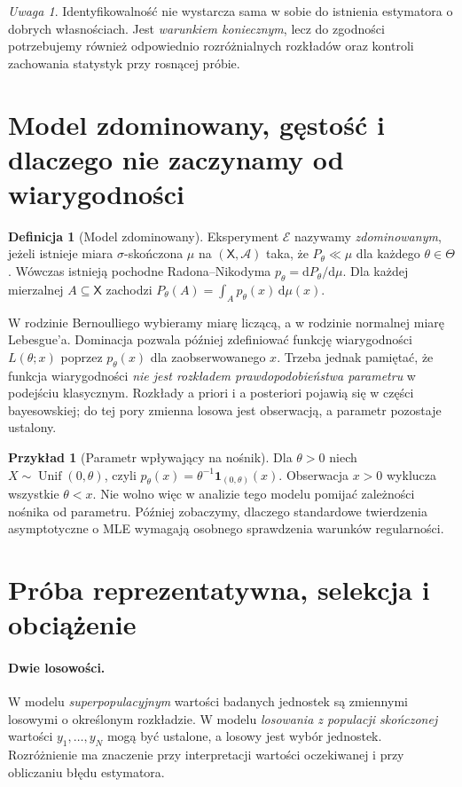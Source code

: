 \documentclass[11pt,a4paper,oneside]{report}
\numberwithin{equation}{chapter}
\theoremstyle{plain}
\theoremstyle{definition}
\newtheorem{definicja}{Definicja}[chapter]
\newtheorem{przyklad}{Przykład}[chapter]
\theoremstyle{remark}
\newtheorem{uwaga}{Uwaga}[chapter]
\newcommand{\calA}{\mathcal A}
\newcommand{\ind}[1]{\mathbf 1_{#1}}
\newcommand{\dd}{\mathrm d}
\begin{document}
\begin{uwaga}
Identyfikowalność nie wystarcza sama w sobie do istnienia estymatora o dobrych własnościach. Jest \emph{warunkiem koniecznym}, lecz do zgodności potrzebujemy również odpowiednio rozróżnialnych rozkładów oraz kontroli zachowania statystyk przy rosnącej próbie.
\end{uwaga}

\section{Model zdominowany, gęstość i dlaczego nie zaczynamy od wiarygodności}
\begin{definicja}[Model zdominowany]
Eksperyment $\mathcal E$ nazywamy \emph{zdominowanym}, jeżeli istnieje miara $\sigma$-skończona $\mu$ na $(\mathsf X,\calA)$ taka, że $P_\theta\ll\mu$ dla każdego $\theta\in\Theta$. Wówczas istnieją pochodne Radona--Nikodyma $p_\theta=\dd P_\theta/\dd\mu$. Dla każdej mierzalnej $A\subseteq\mathsf X$ zachodzi $P_\theta(A)=\int_Ap_\theta(x)\,\dd\mu(x)$.
\end{definicja}

W rodzinie Bernoulliego wybieramy miarę liczącą, a w rodzinie normalnej miarę Lebesgue'a. Dominacja pozwala później zdefiniować funkcję wiarygodności $L(\theta;x)$ poprzez $p_\theta(x)$ dla zaobserwowanego $x$. Trzeba jednak pamiętać, że funkcja wiarygodności \emph{nie jest rozkładem prawdopodobieństwa parametru} w podejściu klasycznym. Rozkłady a priori i a posteriori pojawią się w części bayesowskiej; do tej pory zmienna losowa jest obserwacją, a parametr pozostaje ustalony.

\begin{przyklad}[Parametr wpływający na nośnik]\label{ex:uniform-support}
Dla $\theta>0$ niech $X\sim\operatorname{Unif}(0,\theta)$, czyli $p_\theta(x)=\theta^{-1}\ind{(0,\theta)}(x)$. Obserwacja $x>0$ wyklucza wszystkie $\theta<x$. Nie wolno więc w analizie tego modelu pomijać zależności nośnika od parametru. Później zobaczymy, dlaczego standardowe twierdzenia asymptotyczne o MLE wymagają osobnego sprawdzenia warunków regularności.
\end{przyklad}

\section{Próba reprezentatywna, selekcja i obciążenie}
\paragraph{Dwie losowości.}
W modelu \emph{superpopulacyjnym} wartości badanych jednostek są zmiennymi losowymi o określonym rozkładzie. W modelu \emph{losowania z populacji skończonej} wartości $y_1,\ldots,y_N$ mogą być ustalone, a losowy jest wybór jednostek. Rozróżnienie ma znaczenie przy interpretacji wartości oczekiwanej i przy obliczaniu błędu estymatora.
\end{document}
